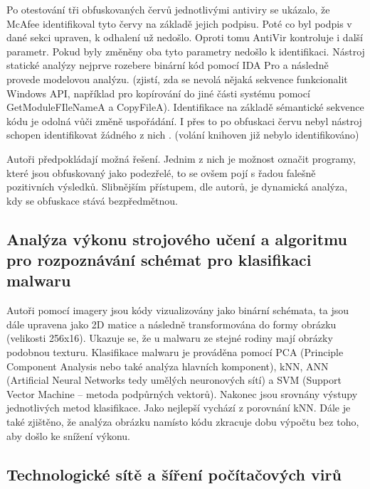 Po otestování tři obfuskovaných červů jednotlivými antiviry se ukázalo, že McAfee identifikoval tyto červy na základě jejich podpisu. Poté co byl podpis v dané sekci upraven, k odhalení už nedošlo. Oproti tomu AntiVir kontroluje i další parametr. Pokud byly změněny oba tyto parametry nedošlo k identifikaci.
Nástroj statické analýzy nejprve rozebere binární kód pomocí IDA Pro a následně provede modelovou analýzu. (zjistí, zda se nevolá nějaká sekvence funkcionalit Windows API, například pro kopírování do jiné části systému pomocí GetModuleFIleNameA a CopyFileA). Identifikace na základě sémantické sekvence kódu je odolná vůči změně uspořádání. I přes to po obfuskaci červu nebyl nástroj schopen identifikovat žádného z nich \cite{stateOfArt4}. (volání knihoven již nebylo identifikováno)

Autoři předpokládají možná řešení. Jednim z nich je možnost označit programy, které jsou obfuskovaný jako podezřelé, to se ovšem pojí s řadou falešně pozitivních výsledků. Slibnějším přístupem, dle autorů, je dynamická analýza, kdy se obfuskace stává bezpředmětnou.

\subsection{Analýza výkonu strojového učení a algoritmu pro rozpoznávání schémat pro klasifikaci malwaru}
\label{stateofArt5_images}

Autoři \cite{stateOfArt5} pomocí imagery jsou kódy vizualizovány jako binární schémata, ta jsou dále upravena jako 2D matice a následně transformována do formy obrázku (velikosti 256x16). Ukazuje se, že u malwaru ze stejné rodiny mají obrázky podobnou texturu. Klasifikace malwaru je prováděna pomocí PCA (Principle Component Analysis nebo také analýza hlavních komponent), kNN, ANN (Artificial Neural Networks tedy umělých neuronových sítí) a SVM (Support Vector Machine – metoda podpůrných vektorů). Nakonec jsou srovnány výstupy jednotlivých metod klasifikace. Jako nejlepší vychází z porovnání kNN. Dále je také zjištěno, že analýza obrázku namísto kódu zkracuje dobu výpočtu bez toho, aby došlo ke snížení výkonu.

\subsection{Technologické sítě a šíření počítačových virů}
\label{stateofArt6_virus}


